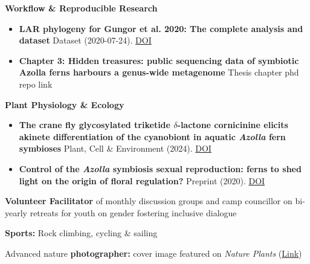 \documentclass[a4paper,10pt]{article}
\begin{document}
\noindent\textbf{Workflow \& Reproducible Research}
  \begin{itemize}
    \item \textbf{LAR phylogeny for Gungor et al. 2020: The complete analysis and dataset}  
      Dataset (2020-07-24). \href{https://doi.org/10.5281/zenodo.3959057}{DOI}
    \item \textbf{Chapter 3: Hidden treasures: public sequencing data of symbiotic Azolla ferns harbours a genus-wide metagenome}
      Thesis chapter phd repo link
  \end{itemize}

\noindent\textbf{Plant Physiology \& Ecology}
  \begin{itemize}
    \item \textbf{The crane fly glycosylated triketide $\delta$-lactone cornicinine elicits akinete differentiation of the cyanobiont in aquatic \textit{Azolla} fern symbioses}  
      Plant, Cell \& Environment (2024). \href{https://doi.org/10.1111/pce.14907}{DOI}
    \item \textbf{Control of the \textit{Azolla} symbiosis sexual reproduction: ferns to shed light on the origin of floral regulation?}  
      Preprint (2020). \href{https://doi.org/10.3389/fpls.2021.693039}{DOI}
  \end{itemize}



\begin{description}
  \raggedright
  \item \textbf{Volunteer Facilitator} of monthly discussion groups and camp councillor on bi-yearly retreats for youth on gender fostering inclusive dialogue
  \item \textbf{Sports:} Rock climbing, cycling \& sailing
  \item Advanced nature \textbf{photographer:} cover image featured on \emph{Nature Plants} (\href{https://lauralwd.github.io/photography/}{Link})
\end{description}
\end{document}
